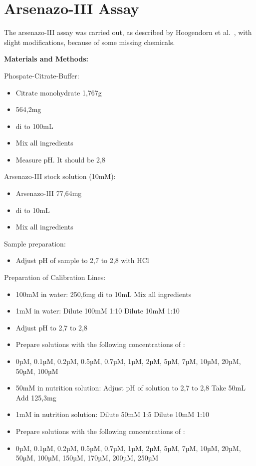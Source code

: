 \section{Arsenazo-III Assay\authorA}

The arsenazo-III assay was carried out, as described by Hoogendorn et al.~\cite{arsenazo3assay}, with slight modifications, because of some missing chemicals.

\textbf{Materials and Methods:}

Phospate-Citrate-Buffer:
\begin{itemize}
    \item Citrate monohydrate 1,767g
    \item {} 564,2mg
    \item di to 100mL
    \item Mix all ingredients
    \item Measure pH. It should be 2,8
\end{itemize}

Arsenazo-III stock solution (10mM):
\begin{itemize}
    \item Arsenazo-III 77,64mg
    \item di to 10mL
    \item Mix all ingredients
\end{itemize}

Sample preparation:
\begin{itemize}
    \item Adjust pH of sample to 2,7 to 2,8 with HCl
\end{itemize}

Preparation of Calibration Lines:
\begin{itemize}
    \item {} 100mM in water:
    \subitem {} 250,6mg
    \subitem di to 10mL
    \subitem Mix all ingredients
    \item {} 1mM in water:
    \subitem Dilute  100mM 1:10
    \subitem Dilute  10mM 1:10
    \item Adjust pH to 2,7 to 2,8
    \item Prepare solutions with the following concentrations of :
    \item 0µM, 0.1µM, 0.2µM, 0.5µM, 0.7µM, 1µM, 2µM, 5µM, 7µM, 10µM, 20µM, 50µM, 100µM
    \item {} 50mM in nutrition solution:
    \subitem Adjust pH of solution to 2,7 to 2,8
    \subitem Take 50mL
    \subitem Add  125,3mg
    \item {} 1mM in nutrition solution:
    \subitem Dilute  50mM 1:5
    \subitem Dilute  10mM 1:10
    \item Prepare solutions with the following concentrations of :
    \item 0µM, 0.1µM, 0.2µM, 0.5µM, 0.7µM, 1µM, 2µM, 5µM, 7µM, 10µM, 20µM, 50µM, 100µM, 150µM, 170µM, 200µM, 250µM
\end{itemize}

